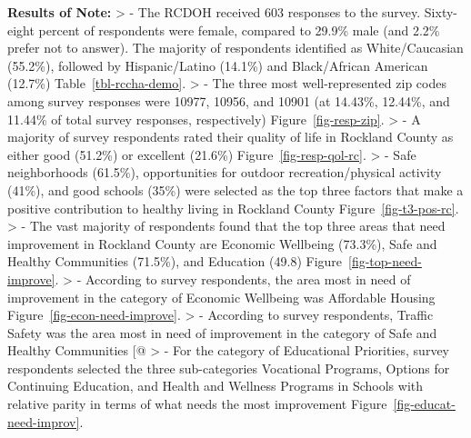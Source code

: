 \documentclass[
  english,
  letterpaper,
]{report}
\begin{document}
\textbf{Results of Note:} \textgreater{} - The RCDOH received 603
responses to the survey. Sixty-eight percent of respondents were female,
compared to 29.9\% male (and 2.2\% prefer not to answer). The majority
of respondents identified as White/Caucasian (55.2\%), followed by
Hispanic/Latino (14.1\%) and Black/African American (12.7\%)
Table~\ref{tbl-rccha-demo}. \textgreater{} - The three most
well-represented zip codes among survey responses were 10977, 10956, and
10901 (at 14.43\%, 12.44\%, and 11.44\% of total survey responses,
respectively) Figure~\ref{fig-resp-zip}. \textgreater{} - A majority of
survey respondents rated their quality of life in Rockland County as
either good (51.2\%) or excellent (21.6\%) Figure~\ref{fig-resp-qol-rc}.
\textgreater{} - Safe neighborhoods (61.5\%), opportunities for outdoor
recreation/physical activity (41\%), and good schools (35\%) were
selected as the top three factors that make a positive contribution to
healthy living in Rockland County Figure~\ref{fig-t3-pos-rc}.
\textgreater{} - The vast majority of respondents found that the top
three areas that need improvement in Rockland County are Economic
Wellbeing (73.3\%), Safe and Healthy Communities (71.5\%), and Education
(49.8) Figure~\ref{fig-top-need-improve}. \textgreater{} - According to
survey respondents, the area most in need of improvement in the category
of Economic Wellbeing was Affordable Housing
Figure~\ref{fig-econ-need-improve}. \textgreater{} - According to survey
respondents, Traffic Safety was the area most in need of improvement in
the category of Safe and Healthy Communities {[}@ \textgreater{} - For
the category of Educational Priorities, survey respondents selected the
three sub-categories Vocational Programs, Options for Continuing
Education, and Health and Wellness Programs in Schools with relative
parity in terms of what needs the most improvement
Figure~\ref{fig-educat-need-improv}.
\end{document}
